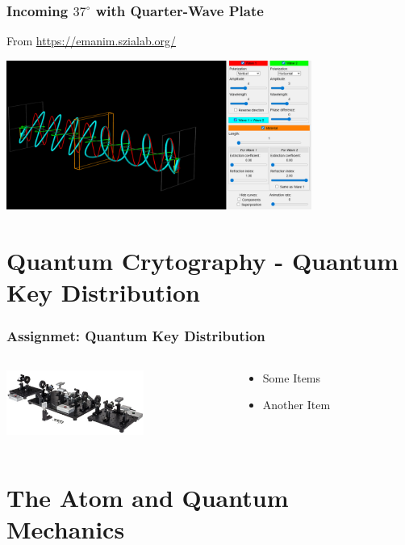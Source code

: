 \documentclass{beamer}
\begin{document}
\begin{frame}\frametitle{Incoming $37^\circ$ with Quarter-Wave Plate}
From \url{https://emanim.szialab.org/}

\begin{center}
\includegraphics[width=10cm]{fig/waveplate_37_4.png}
\end{center}
\end{frame}

\section{Quantum Crytography - Quantum Key Distribution}

\begin{frame}\frametitle{Assignmet: Quantum Key Distribution}
\begin{columns}
\begin{column}{4.5cm}
\begin{center}
\includegraphics[width=4.5cm]{fig/ThorQKD.jpg}
\end{center}
\end{column}
\begin{column}{7cm}
\begin{itemize}
\item Some Items
\item Another Item
\end{itemize}
\end{column}
\end{columns}
\end{frame}

\section{The Atom and Quantum Mechanics}
\end{document}
